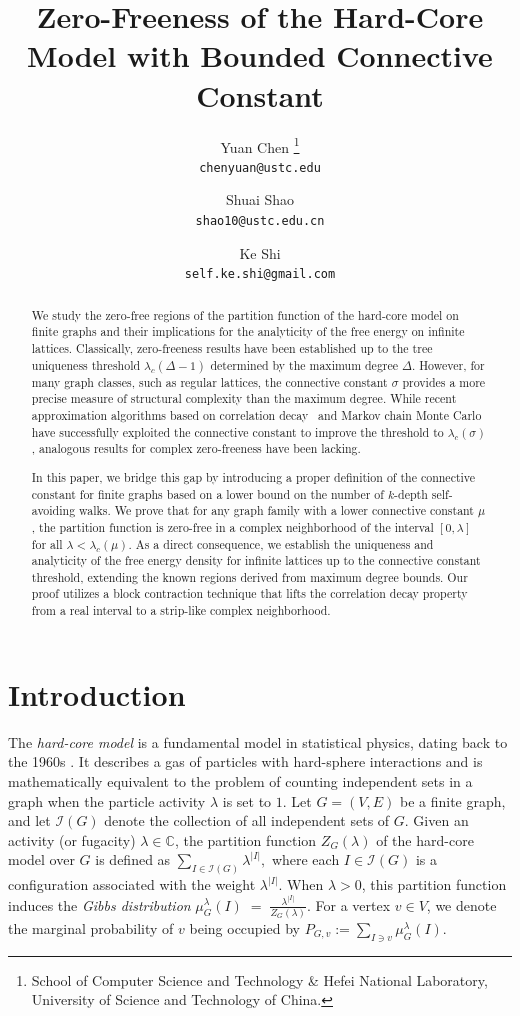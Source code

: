 \documentclass[a4paper,11pt]{article}
\title{\textbf{Zero-Freeness of the Hard-Core Model with Bounded Connective Constant}}
\author{
Yuan Chen \thanks{School of Computer Science and Technology \& Hefei National Laboratory, University of Science and Technology of China.} \\ {\tt chenyuan@ustc.edu}
\and
Shuai Shao\footnotemark[1]\\
{\tt shao10@ustc.edu.cn}
\and
Ke Shi\footnotemark[1]\\
{\tt self.ke.shi@gmail.com}}
\date{}
\theoremstyle{plain}
\theoremstyle{definition}
\theoremstyle{remark}
\newcommand{\1}{\mathbf{1}}
\newcommand{\calI}{\mathcal{I}}
\begin{document}
\maketitle
\begin{abstract}
    We study the zero-free regions of the partition function of the hard-core model on finite graphs and their implications for the analyticity of the free energy on infinite lattices. 
    Classically, zero-freeness results have been established up to the tree uniqueness threshold $\lambda_c(\Delta-1)$ determined by the maximum degree $\Delta$. 
    However, for many graph classes, such as regular lattices, the connective constant $\sigma$ provides a more precise measure of structural complexity than the maximum degree. 
    While recent approximation algorithms based on correlation decay~\cite{sinclair2017spatial} and Markov chain Monte Carlo~\cite{efthymiou2026sampling} have successfully exploited the connective constant to improve the threshold to $\lambda_c(\sigma)$, analogous results for complex zero-freeness have been lacking.
    
    In this paper, we bridge this gap by introducing a proper definition of the connective constant for finite graphs based on a lower bound on the number of $k$-depth self-avoiding walks. 
    We prove that for any graph family with a lower connective constant $\mu$, the partition function is zero-free in a complex neighborhood of the interval $[0, \lambda]$ for all $\lambda < \lambda_c(\mu)$. 
    As a direct consequence, we establish the uniqueness and analyticity of the free energy density for infinite lattices up to the connective constant threshold, extending the known regions derived from maximum degree bounds.
    Our proof utilizes a block contraction technique that lifts the correlation decay property from a real interval to a strip-like complex neighborhood. 
\end{abstract}
\thispagestyle{empty}
\clearpage
\newpage
\setcounter{page}{1} 
\section{Introduction}

The \emph{hard-core model} is a fundamental model in statistical physics, dating back to the 1960s \cite{runnels1965hard}. It describes a gas of particles with hard-sphere interactions and is mathematically equivalent to the problem of counting independent sets in a graph when the particle activity $\lambda$ is set to $1$.
Let $G=(V,E)$ be a finite graph, and let $\mathcal{I}(G)$ denote the collection of all independent sets of $G$. 
Given an activity (or fugacity) $\lambda \in\mathbb{C}$, the partition function $Z_G(\lambda)$ of the hard-core model over $G$ is defined as $\sum_{I \in \mathcal I(G)} \lambda^{|I|},$ where each $I\in\calI(G)$ is a configuration associated with the weight $\lambda^{|I|}$.
When $\lambda>0$, this partition function induces the \emph{Gibbs
distribution}
$\mu_G^\lambda(I) \;=\; \frac{\lambda^{|I|}}{Z_G(\lambda)}.$
For a vertex $v\in V$, we denote the marginal probability of $v$ being occupied by $P_{G,v} := \sum_{I \ni v} \mu_G^\lambda(I)$.
\end{document}
